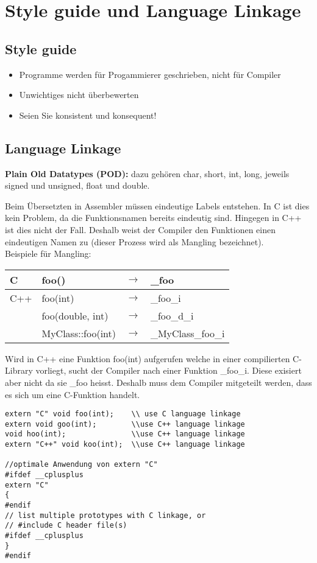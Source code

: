\section{Style guide und Language Linkage}
\subsection{Style guide}
\begin{itemize}
	\item Programme werden für Progammierer geschrieben, nicht für Compiler
	\item Unwichtiges nicht überbewerten
	\item Seien Sie konsistent und konsequent!
\end{itemize}


\subsection{Language Linkage}
  \textbf{Plain Old Datatypes (POD):} dazu gehören char, short, int, long, jeweils signed und unsigned, float und double.
  
  Beim Übersetzten in Assembler müssen eindeutige Labels entstehen. In C ist dies kein Problem,
  da die Funktionsnamen bereits eindeutig sind. Hingegen in C++ ist dies nicht der Fall. Deshalb weist der
  Compiler den Funktionen einen eindeutigen Namen zu (dieser Prozess wird als Mangling bezeichnet).\\
  
  Beispiele für Mangling:\\
  \begin{tabular}{|l|lll|}
  \hline
    C   & foo() & $\rightarrow$ & \_foo \\
  \hline
    C++ & foo(int) & $\rightarrow$ & \_foo\_i \\
        & foo(double, int) & $\rightarrow$ & \_foo\_d\_i \\
        & MyClass::foo(int) & $\rightarrow$ & \_MyClass\_foo\_i \\
  \hline
  \end{tabular}
  
  Wird in C++ eine Funktion foo(int) aufgerufen welche in einer compilierten C-Library vorliegt, sucht der
  Compiler nach einer Funktion \_foo\_i. Diese exisiert aber nicht da sie \_foo heisst. Deshalb muss dem Compiler
  mitgeteilt werden, dass es sich um eine C-Funktion handelt.\\
  
\begin{lstlisting}[style=Cpp]
extern "C" void foo(int);    \\ use C language linkage
extern void goo(int);        \\use C++ language linkage
void hoo(int);               \\use C++ language linkage
extern "C++" void koo(int);  \\use C++ language linkage

//optimale Anwendung von extern "C"
#ifdef __cplusplus
extern "C"
{
#endif
// list multiple prototypes with C linkage, or
// #include C header file(s)
#ifdef __cplusplus
}
#endif
\end{lstlisting}
